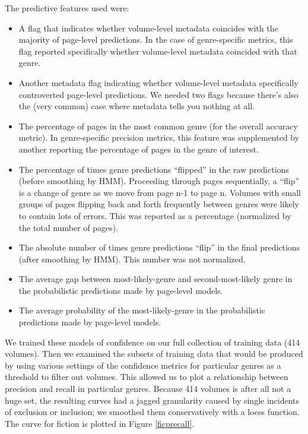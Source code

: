 \documentclass[paper=a4, fontsize=12pt]{scrartcl}
\numberwithin{equation}{section}		%
\numberwithin{figure}{section}			%
\numberwithin{table}{section}				%
\begin{document}
The predictive features used were:
\begin{itemize}
\item A flag that indicates whether volume-level metadata coincides with the majority of page-level predictions. In the case of genre-specific metrics, this flag reported specifically whether volume-level metadata coincided with that genre.
\item Another metadata flag indicating whether volume-level metadata specifically controverted page-level predictions. We needed two flags because there's also the (very common) case where metadata tells you nothing at all.
\item The percentage of pages in the most common genre (for the overall accuracy metric). In genre-specific precision metrics, this feature was supplemented by another reporting the percentage of pages in the genre of interest.
\item The percentage of times genre predictions ``flipped'' in the raw predictions (before smoothing by HMM). Proceeding through pages sequentially, a ``flip'' is a change of genre as we move from page n-1 to page n. Volumes with small groups of pages flipping back and forth frequently between genres were likely to contain lots of errors. This was reported as a percentage (normalized by the total number of pages).
\item The absolute number of times genre predictions ``flip'' in the final predictions (after smoothing by HMM). This number was not normalized.
\item The average gap between most-likely-genre and second-most-likely genre in the probabilistic predictions made by page-level models.
\item The average probability of the most-likely-genre in the probabilistic predictions made by page-level models.
\end{itemize}

We trained these models of confidence on our full collection of training data (414 volumes). Then we examined the subsets of training data that would be produced by using various settings of the confidence metrics for particular genres as a threshold to filter out volumes. This allowed us to plot a relationship between precision and recall in particular genres. Because 414 volumes is after all not a huge set, the resulting curves had a jagged granularity caused by single incidents of exclusion or inclusion; we smoothed them conservatively with a loess function. The curve for fiction is plotted in Figure \ref{ficprecall}.
\end{document}
